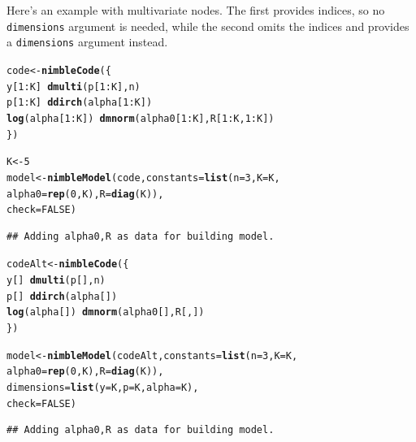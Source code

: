 \documentclass[12pt,oneside]{book}\usepackage[]{graphicx}\usepackage[]{color}
\makeatletter
\newcommand{\hlnum}[1]{\textcolor[rgb]{0.686,0.059,0.569}{#1}}%
\newcommand{\hlopt}[1]{\textcolor[rgb]{0,0,0}{#1}}%
\newcommand{\hlstd}[1]{\textcolor[rgb]{0.345,0.345,0.345}{#1}}%
\newcommand{\hlkwb}[1]{\textcolor[rgb]{0.69,0.353,0.396}{#1}}%
\newcommand{\hlkwc}[1]{\textcolor[rgb]{0.333,0.667,0.333}{#1}}%
\newcommand{\hlkwd}[1]{\textcolor[rgb]{0.737,0.353,0.396}{\textbf{#1}}}%
\newenvironment{kframe}{%
 \def\at@end@of@kframe{}%
 \ifinner\ifhmode%
  \def\at@end@of@kframe{\end{minipage}}%
  \begin{minipage}{\columnwidth}%
 \fi\fi%
 \def\FrameCommand##1{\hskip\@totalleftmargin \hskip-\fboxsep
 \colorbox{shadecolor}{##1}\hskip-\fboxsep
     \hskip-\linewidth \hskip-\@totalleftmargin \hskip\columnwidth}%
 \MakeFramed {\advance\hsize-\width
   \@totalleftmargin\z@ \linewidth\hsize
   \@setminipage}}%
 {\par\unskip\endMakeFramed%
 \at@end@of@kframe}
\newenvironment{knitrout}{}{} %
\def\cd#1{\texttt{#1}}
\makeatother
\begin{document}
Here's an example with multivariate nodes.  The first provides indices, so
no \cd{dimensions} argument is needed, while the second omits the
indices and provides a \cd{dimensions} argument instead.

\begin{knitrout}
\color{fgcolor}\begin{kframe}
\begin{alltt}
\hlstd{code} \hlkwb{<-} \hlkwd{nimbleCode}\hlstd{(\{}
  \hlstd{y[}\hlnum{1}\hlopt{:}\hlstd{K]} \hlopt{~} \hlkwd{dmulti}\hlstd{(p[}\hlnum{1}\hlopt{:}\hlstd{K], n)}
  \hlstd{p[}\hlnum{1}\hlopt{:}\hlstd{K]} \hlopt{~} \hlkwd{ddirch}\hlstd{(alpha[}\hlnum{1}\hlopt{:}\hlstd{K])}
  \hlkwd{log}\hlstd{(alpha[}\hlnum{1}\hlopt{:}\hlstd{K])} \hlopt{~} \hlkwd{dmnorm}\hlstd{(alpha0[}\hlnum{1}\hlopt{:}\hlstd{K], R[}\hlnum{1}\hlopt{:}\hlstd{K,} \hlnum{1}\hlopt{:}\hlstd{K])}
\hlstd{\})}

\hlstd{K} \hlkwb{<-} \hlnum{5}
\hlstd{model} \hlkwb{<-} \hlkwd{nimbleModel}\hlstd{(code,} \hlkwc{constants} \hlstd{=} \hlkwd{list}\hlstd{(}\hlkwc{n} \hlstd{=} \hlnum{3}\hlstd{,} \hlkwc{K} \hlstd{= K,}
                          \hlkwc{alpha0} \hlstd{=} \hlkwd{rep}\hlstd{(}\hlnum{0}\hlstd{, K),} \hlkwc{R} \hlstd{=} \hlkwd{diag}\hlstd{(K)),}
                     \hlkwc{check} \hlstd{=} \hlnum{FALSE}\hlstd{)}
\end{alltt}
\begin{verbatim}
## Adding alpha0,R as data for building model.
\end{verbatim}
\begin{alltt}
\hlstd{codeAlt} \hlkwb{<-} \hlkwd{nimbleCode}\hlstd{(\{}
  \hlstd{y[]} \hlopt{~} \hlkwd{dmulti}\hlstd{(p[], n)}
  \hlstd{p[]} \hlopt{~} \hlkwd{ddirch}\hlstd{(alpha[])}
  \hlkwd{log}\hlstd{(alpha[])} \hlopt{~} \hlkwd{dmnorm}\hlstd{(alpha0[], R[ , ])}
\hlstd{\})}

\hlstd{model} \hlkwb{<-} \hlkwd{nimbleModel}\hlstd{(codeAlt,} \hlkwc{constants} \hlstd{=} \hlkwd{list}\hlstd{(}\hlkwc{n} \hlstd{=} \hlnum{3}\hlstd{,} \hlkwc{K} \hlstd{= K,}
                          \hlkwc{alpha0} \hlstd{=} \hlkwd{rep}\hlstd{(}\hlnum{0}\hlstd{, K),} \hlkwc{R} \hlstd{=} \hlkwd{diag}\hlstd{(K)),}
                  \hlkwc{dimensions} \hlstd{=} \hlkwd{list}\hlstd{(}\hlkwc{y} \hlstd{= K,} \hlkwc{p} \hlstd{= K,} \hlkwc{alpha} \hlstd{= K),}
                      \hlkwc{check} \hlstd{=} \hlnum{FALSE}\hlstd{)}
\end{alltt}
\begin{verbatim}
## Adding alpha0,R as data for building model.
\end{verbatim}
\end{kframe}
\end{knitrout}
\end{document}
